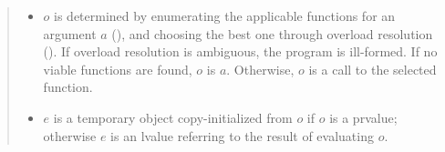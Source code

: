\begin{quote}
\begin{itemize}

\item  
$o$ is determined by enumerating the applicable  functions for an argument $a$ (), and choosing the best one through overload resolution (). If overload resolution is ambiguous, the program is ill-formed. If no viable functions are found, $o$ is $a$. Otherwise, $o$ is a call to the selected function.

%
  \item $e$ is a temporary object copy-initialized from $o$ if $o$ is a prvalue; otherwise $e$ is an lvalue referring to the result of evaluating $o$.
  

\end{itemize}
\end{quote}
